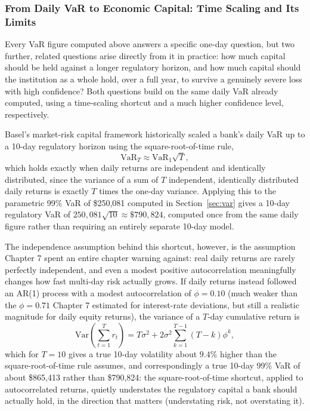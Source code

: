 \documentclass[../ai_in_finance]{subfiles}
\begin{document}
\subsubsection*{From Daily VaR to Economic Capital: Time Scaling and Its Limits}
\label{sec:econ-capital}

Every VaR figure computed above answers a specific one-day question, but two further, related questions arise directly from it in practice: how much capital should be held against a longer regulatory horizon, and how much capital should the institution as a whole hold, over a full year, to survive a genuinely severe loss with high confidence? Both questions build on the same daily VaR already computed, using a time-scaling shortcut and a much higher confidence level, respectively.

Basel's market-risk capital framework historically scaled a bank's daily VaR up to a 10-day regulatory horizon using the square-root-of-time rule,
\begin{equation*}
\text{VaR}_T \approx \text{VaR}_1 \sqrt{T},
\end{equation*}
which holds exactly when daily returns are independent and identically distributed, since the variance of a sum of $T$ independent, identically distributed daily returns is exactly $T$ times the one-day variance. Applying this to the parametric 99\% VaR of \$250,081 computed in Section~\ref{sec:var} gives a 10-day regulatory VaR of $250{,}081\sqrt{10}\approx\$790{,}824$, computed once from the same daily figure rather than requiring an entirely separate 10-day model.

The independence assumption behind this shortcut, however, is the assumption Chapter 7 spent an entire chapter warning against: real daily returns are rarely perfectly independent, and even a modest positive autocorrelation meaningfully changes how fast multi-day risk actually grows. If daily returns instead followed an AR(1) process with a modest autocorrelation of $\phi=0.10$ (much weaker than the $\phi=0.71$ Chapter 7 estimated for interest-rate deviations, but still a realistic magnitude for daily equity returns), the variance of a $T$-day cumulative return is
\begin{equation*}
\text{Var}\left(\sum_{t=1}^T r_t\right) = T\sigma^2 + 2\sigma^2\sum_{k=1}^{T-1}(T-k)\phi^k,
\end{equation*}
which for $T=10$ gives a true 10-day volatility about $9.4\%$ higher than the square-root-of-time rule assumes, and correspondingly a true 10-day 99\% VaR of about \$865,413 rather than \$790,824: the square-root-of-time shortcut, applied to autocorrelated returns, quietly understates the regulatory capital a bank should actually hold, in the direction that matters (understating risk, not overstating it).
\end{document}
